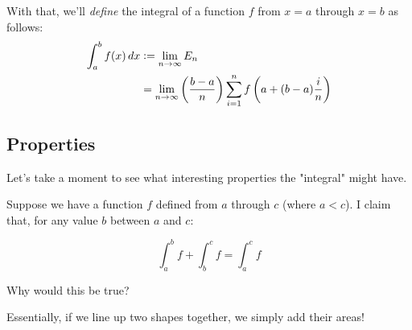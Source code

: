 \documentclass{book}
\newcommand{\defeq}{\vcentcolon=}
\begin{document}
With that, we'll \emph{define} the integral of a function $f$ from $x = a$ through $x = b$ as follows:
\begin{align*}
\int_{a}^{b} f(x)\, dx &\defeq \lim_{n \rightarrow \infty} E_n \\
&= \lim_{n \rightarrow \infty} \left(\frac{b-a}{n}\right) \sum_{i=1}^n f\left(a + (b-a)\frac{i}{n}\right)
\end{align*}







\subsection{Properties}


Let's take a moment to see what interesting properties the "integral" might have.


Suppose we have a function $f$ defined from $a$ through $c$ (where $a < c$). I claim that, for any value $b$ between $a$ and $c$:

\begin{equation}
\int_{a}^{b} f + \int_{b}^{c} f = \int_{a}^{c} f
\end{equation}

Why would this be true?


Essentially, if we line up two shapes together, we simply add their areas!








\end{document}
